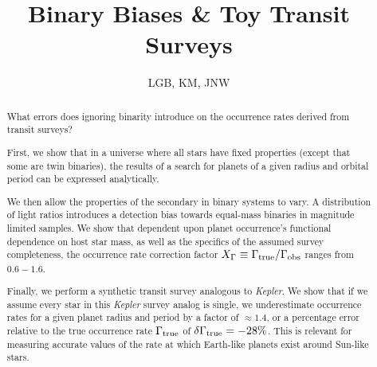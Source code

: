 \documentclass{emulateapj}
\begin{document}
%
\def\ltsima{$\; \buildrel < \over \sim \;$}
\def\lsim{\lower.5ex\hbox{\ltsima}}
\def\gtsima{$\; \buildrel > \over \sim \;$}
\def\gsim{\lower.5ex\hbox{\gtsima}}
\def\tess{{\it TESS} }
\def \teff {T_{\rm eff}}
\def \phir {\Phi_{\rm R}}
\def \fov {24$^{\circ}$}
\def \pixsz {21.1''}
\def \aeff {69.1 cm$^2$ }    
\def \epd {105 mm}                          

\def \kepler {{\it Kepler}}

%



\title{Binary Biases \& Toy Transit Surveys }

\author{
  LGB, KM, JNW
}



\begin{abstract}

What errors does ignoring binarity introduce on the occurrence rates derived 
from transit surveys?

First, we show that in a universe where all stars have fixed properties
(except that some are twin binaries), the results of a search for planets of a 
given radius and orbital period can be expressed analytically.

We then allow the properties of the secondary in binary systems to vary. A 
distribution of light ratios introduces a detection bias towards 
equal-mass binaries in magnitude limited samples.
We show that dependent upon planet occurrence's functional dependence on host 
star mass, as well as the specifics of the assumed survey completeness, the 
occurrence rate correction factor $X_\Gamma \equiv \Gamma_{\rm 
true}/\Gamma_{\rm obs}$ ranges from $0.6-1.6$.

Finally, we perform a synthetic transit survey analogous to {\it Kepler}. We 
show that if we assume every star in this {\it Kepler} survey analog is single, 
we underestimate occurrence rates for a given planet radius and period by 
a factor of $\approx 1.4$, or a percentage error relative to the true 
occurrence rate $\Gamma_{\rm true}$ of $\delta\Gamma_{\rm 
true}=-28\%$. This is relevant for measuring accurate values of the rate at 
which Earth-like planets exist around Sun-like stars.


\end{abstract}
\end{document}
